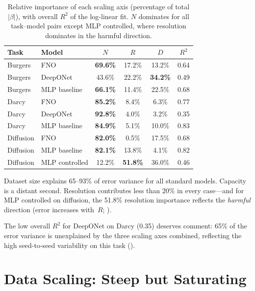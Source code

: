 \documentclass[11pt]{article}
\begin{document}
\begin{table}[h]
\centering
\caption{Relative importance of each scaling axis
(percentage of total $|\beta|$), with overall $R^2$ of the
log-linear fit. $N$ dominates for all task--model pairs
except MLP controlled, where resolution dominates in the
harmful direction.}
\label{tab:importance}
\begin{tabular}{@{}llcccc@{}}
\toprule
\textbf{Task} & \textbf{Model} & $N$ & $R$ & $D$ & $R^2$ \\
\midrule
Burgers   & FNO          & \textbf{69.6\%} & 17.2\% & 13.2\% & 0.64 \\
Burgers   & DeepONet     & 43.6\% & 22.2\% & \textbf{34.2\%} & 0.49 \\
Burgers   & MLP baseline & \textbf{66.1\%} & 11.4\% & 22.5\% & 0.68 \\
Darcy     & FNO          & \textbf{85.2\%} & 8.4\%  & 6.3\%  & 0.77 \\
Darcy     & DeepONet     & \textbf{92.8\%} & 4.0\%  & 3.2\%  & 0.35 \\
Darcy     & MLP baseline & \textbf{84.9\%} & 5.1\%  & 10.0\% & 0.83 \\
Diffusion & FNO          & \textbf{82.0\%} & 0.5\%  & 17.5\% & 0.68 \\
Diffusion & MLP baseline & \textbf{82.1\%} & 13.8\% & 4.1\%  & 0.82 \\
Diffusion & MLP controlled & 12.2\% & \textbf{51.8\%} & 36.0\% & 0.46 \\
\bottomrule
\end{tabular}
\end{table}

Dataset size explains 65--93\% of error variance for all standard
models. Capacity is a distant second. Resolution contributes less
than 20\% in every case---and for MLP controlled on diffusion, the
51.8\% resolution importance reflects the \emph{harmful} direction
(error increases with~$R$; ).

The low overall $R^2$ for DeepONet on Darcy (0.35) deserves
comment: 65\% of the error variance is unexplained by the
three scaling axes combined, reflecting the high seed-to-seed
variability on this task ().


\section{Data Scaling: Steep but Saturating}
\label{sec:data}
\end{document}
